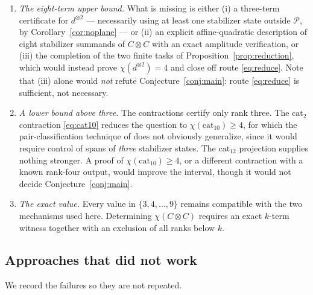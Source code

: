 \documentclass[11pt]{article}
\theoremstyle{plain}
\theoremstyle{definition}
\newcommand{\cat}{\mathrm{cat}}
\begin{document}
\begin{enumerate}[label=\textbf{(G\arabic*)},leftmargin=*]
\item \emph{The eight-term upper bound.} What is missing is either (i) a three-term
certificate for $d^{\otimes2}$ --- necessarily using at least one stabilizer state
outside $\mathcal P$, by Corollary~\ref{cor:noplane} --- or (ii) an explicit
affine-quadratic description of eight stabilizer summands of $C\otimes C$ with an exact
amplitude verification, or (iii) the completion of the two finite tasks of
Proposition~\ref{prop:reduction}, which would instead prove $\chi(d^{\otimes2})=4$ and
close off route \eqref{eq:reduce}. Note that (iii) alone would \emph{not} refute
Conjecture~\ref{conj:main}: route \eqref{eq:reduce} is sufficient, not necessary.
\item \emph{A lower bound above three.} The contractions certify only rank three. The
$\cat_2$ contraction \eqref{eq:cat10} reduces the question to $\chi(\cat_{10})\ge4$,
for which the pair-classification technique of \cite{QPG2021} does not obviously
generalize, since it would require control of spans of \emph{three} stabilizer states.
The $\cat_{12}$ projection supplies nothing stronger. A proof of $\chi(\cat_{10})\ge4$,
or a different contraction with a known rank-four output, would improve the interval,
though it would not decide Conjecture~\ref{conj:main}.
\item \emph{The exact value.} Every value in $\{3,4,\dots,9\}$ remains compatible with
the two mechanisms used here. Determining $\chi(C\otimes C)$ requires an exact
$k$-term witness together with an exclusion of all ranks below $k$.
\end{enumerate}

\subsection{Approaches that did not work}

We record the failures so they are not repeated.
\end{document}
